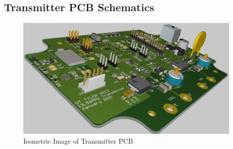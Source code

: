 \documentclass[12pt]{article}
\begin{document}
\begin{appendices}
\section{Transmitter PCB Schematics}
\hfill
\begin{figure}[h!]
\centering
\includegraphics[angle=270, width=0.68\linewidth]{trans_pcb_img}
\caption{Isometric Image of Transmitter PCB}
\end{figure}
\hfill
\pagebreak

\pagebreak

\pagebreak

\pagebreak

%
\pagebreak


\end{appendices}
\end{document}
